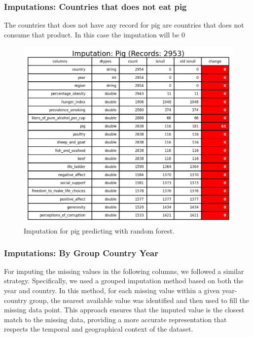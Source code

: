             \subsubsection{Imputations: Countries that does not eat pig}
                The countries that does not have any record for pig are countries that does not consume that product. In this case the imputation will be 0
                \begin{figure}[H]
                        \centering
                        \includegraphics[scale=1]{images/dp_imput_pig}
                        \caption{Imputation for pig predicting with random forest.}
                        \label{fig:dp-imput-pig}
                \end{figure}

            \subsubsection{Imputations: By Group Country Year}

                For imputing the missing values in the following columns, we followed a similar strategy. Specifically, we used a grouped imputation method based on both the year and country.
                In this method, for each missing value within a given year-country group, the nearest available value was identified and then used to fill the missing data point. This approach ensures that the imputed value is the closest match to the missing data, providing a more accurate representation that respects the temporal and geographical context of the dataset.

